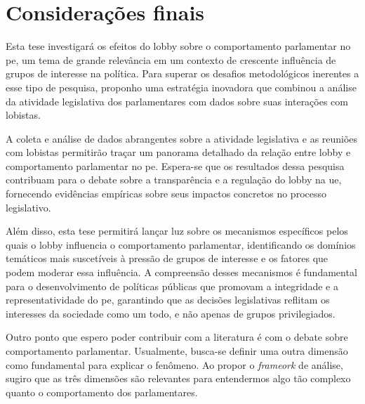 \chapter{Considerações finais}
\label{chapter:considfinal}

Esta tese investigará os efeitos do lobby sobre o comportamento parlamentar no \acrshort{pe}, um tema de grande relevância em um contexto de crescente influência de grupos de interesse na política. Para superar os desafios metodológicos inerentes a esse tipo de pesquisa, proponho uma estratégia inovadora que combinou a análise da atividade legislativa dos parlamentares com dados sobre suas interações com lobistas.

A coleta e análise de dados abrangentes sobre a atividade legislativa e as reuniões com lobistas permitirão traçar um panorama detalhado da relação entre lobby e comportamento parlamentar no \acrshort{pe}. Espera-se que os resultados dessa pesquisa contribuam para o debate sobre a transparência e a regulação do lobby na \acrshort{ue}, fornecendo evidências empíricas sobre seus impactos concretos no processo legislativo.

Além disso, esta tese permitirá lançar luz sobre os mecanismos específicos pelos quais o lobby influencia o comportamento parlamentar, identificando os domínios temáticos mais suscetíveis à pressão de grupos de interesse e os fatores que podem moderar essa influência. A compreensão desses mecanismos é fundamental para o desenvolvimento de políticas públicas que promovam a integridade e a representatividade do \acrshort{pe}, garantindo que as decisões legislativas reflitam os interesses da sociedade como um todo, e não apenas de grupos privilegiados.

Outro ponto que espero poder contribuir com a literatura é com o debate sobre comportamento parlamentar. Usualmente, busca-se definir uma outra dimensão como fundamental para explicar o fenômeno. Ao propor o \textit{frameork} de análise, sugiro que as três dimensões são relevantes para entendermos algo tão complexo quanto o comportamento dos parlamentares.


